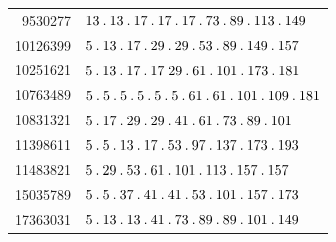 \begin{longtable}{@{}r|l@{}}
9530277 & $13\pdot 13\pdot 17\pdot 17\pdot 17\pdot 73\pdot 89\pdot 113\pdot 149$\\
10126399 & $5\pdot 13\pdot 17\pdot 29\pdot 29\pdot 53\pdot 89\pdot 149\pdot 157$\\
10251621 & $5\pdot 13\pdot 17\pdot 17\;29\pdot 61\pdot 101\pdot 173\pdot 181$\\
10763489 & $5\pdot 5\pdot 5\pdot 5\pdot 5\pdot 5\pdot 61\pdot 61\pdot 101\pdot 109\pdot 181$\\
10831321 & $5\pdot 17\pdot 29\pdot 29\pdot 41\pdot 61\pdot 73\pdot 89\pdot 101$\\
11398611 & $5\pdot 5\pdot 13\pdot 17\pdot 53\pdot 97\pdot 137\pdot 173\pdot 193$\\
11483821 & $5\pdot 29\pdot 53\pdot 61\pdot 101\pdot 113\pdot 157\pdot 157$\\
15035789 & $5\pdot 5\pdot 37\pdot 41\pdot 41\pdot 53\pdot 101\pdot 157\pdot 173$\\
17363031 & $5\pdot 13\pdot 13\pdot 41\pdot 73\pdot 89\pdot 89\pdot 101\pdot 149$\\
\end{longtable}\endgroup
